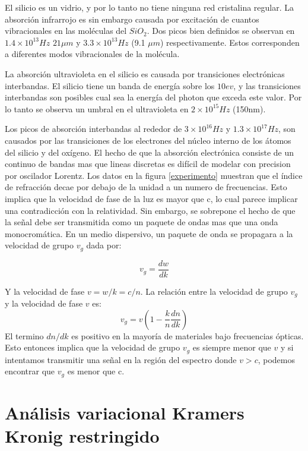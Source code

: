 \documentclass[a4paper,openright,12pt]{book}
\begin{document}
El silicio es un vidrio, y por lo tanto no tiene ninguna red cristalina regular. La absorción infrarrojo es sin embargo causada por excitación de cuantos vibracionales en las moléculas del $SiO_{2}$. Dos picos bien definidos se observan en $1.4\times 10^{13}Hz$ $21\mu m$ y $3.3\times 10^{13}Hz$ (9.1 $\mu m$) respectivamente. Estos corresponden a diferentes modos vibracionales de la molécula. 

La absorción ultravioleta en el silicio es causada por transiciones electrónicas interbandas. El silicio tiene un banda de energía sobre los $10ev$, y las transiciones interbandas son posibles cual sea la energía del photon que exceda este valor. Por lo tanto se observa un umbral en el ultravioleta en $2\times 10^{15}Hz$ (150nm).

Los picos de absorción interbandas al rededor de $ 3 \times  10^{16}Hz$ y $1.3 \times 10^{17} Hz$, son causados por las transiciones de los electrones del núcleo interno de los átomos del silicio y del oxígeno. El hecho de que la absorción electrónica consiste de un continuo de bandas mas que lineas discretas es difícil de modelar con precision por oscilador Lorentz. 
Los datos en la figura \ref{experimento} muestran que el índice de refracción decae por debajo de la unidad a un numero de frecuencias. Esto implica que la velocidad de fase de la luz es mayor que c, lo cual parece implicar una contradicción con la relatividad. Sin embargo, se sobrepone el hecho de que la señal debe ser transmitida como un paquete de ondas mas que una onda monocromática. En un medio dispersivo, un paquete de onda se propagara a la velocidad de grupo $v_{g}$ dada por:

\begin{equation}
v_{g}=\frac{dw}{dk}
\end{equation}

Y la velocidad de fase $v=w/k=c/n$. La relación entre la velocidad de grupo $v_{g}$ y la velocidad de fase $v$ es:
\begin{equation}
v_{g}=v(1-\frac{k}{n}\frac{dn}{dk})
\end{equation}
El termino $dn/dk$ es positivo en la mayoría de materiales bajo frecuencias ópticas. Esto entonces implica que la velocidad de grupo $v_{g}$ es siempre menor que $v$ y si intentamos transmitir una señal en la región del espectro donde $v>c$, podemos encontrar que $v_{g}$ es menor que c. 


\section{Análisis variacional Kramers Kronig restringido}
\end{document}
